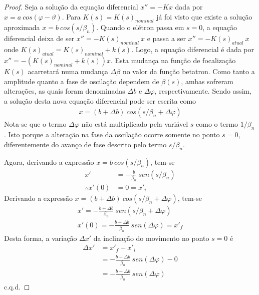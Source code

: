 \begin{proof}
	Seja a solução da equação diferencial $x'' = -Kx$ dada por $x = a\ cos(\varphi-\vartheta)$. Para $K(s) = K(s)_{nominal}$ já foi visto que existe a solução aproximada $x = b\ cos(s/\beta_n)$. Quando o elétron passa em $s=0$, a equação diferencial deixa de ser $x'' = -K(s)_{nominal}\ x$ e passa a ser $x'' = -K(s)_{atual}\ x$ onde $K(s)_{atual} = K(s)_{nominal} + k(s)$. Logo, a equação diferencial é dada por $x'' = -(K(s)_{nominal} + k(s))x$. Esta mudança na função de focalização $K(s)$ acarretará numa mudança $\Delta \beta$ no valor da função betatron. Como tanto a amplitude quanto a fase de oscilação dependem de $\beta(s)$, ambas sofreram alterações, as quais foram denominadas $\Delta b$ e $\Delta \varphi$, respectivamente. Sendo assim, a solução desta nova equação diferencial pode ser escrita como
	\begin{align*}
		x = (b+\Delta b)\ cos(s/\beta_n + \Delta \varphi)
	\end{align*}
	Nota-se que o termo $\Delta \varphi$ não está multiplicado pela variável $s$ como o termo $1/\beta_n$. Isto porque a alteração na fase da oscilação ocorre somente no ponto $s=0$, diferentemente do avanço de fase descrito pelo termo $s/\beta_n$.
	
	Agora, derivando a expressão $x = b\ cos(s/\beta_n)$, tem-se
	\begin{align*}
		x' &= -\frac{b}{\beta_n}\ sen(s/\beta_n)\\
		\therefore x'(0) &= 0 = x'_i
	\end{align*}
	Derivando a expressão $x = (b+\Delta b)\ cos(s/\beta_n + \Delta \varphi)$, tem-se
	\begin{align*}
		x' = -\frac{b+\Delta b}{\beta_n}\ sen(s/\beta_n + \Delta \varphi)\\
		x'(0) = -\frac{b+\Delta b}{\beta_n}\ sen(\Delta \varphi) = x'_f
	\end{align*}
	Desta forma, a variação $\Delta x'$ da inclinação do movimento no ponto $s=0$ é
	\begin{align*}
		\Delta x' &= x'_f - x'_i\\
				  &= -\frac{b+\Delta b}{\beta_n}\ sen(\Delta \varphi) - 0\\
				  & = -\frac{b+\Delta b}{\beta_n}\ sen(\Delta \varphi)
	\end{align*}
	c.q.d.
\end{proof}

